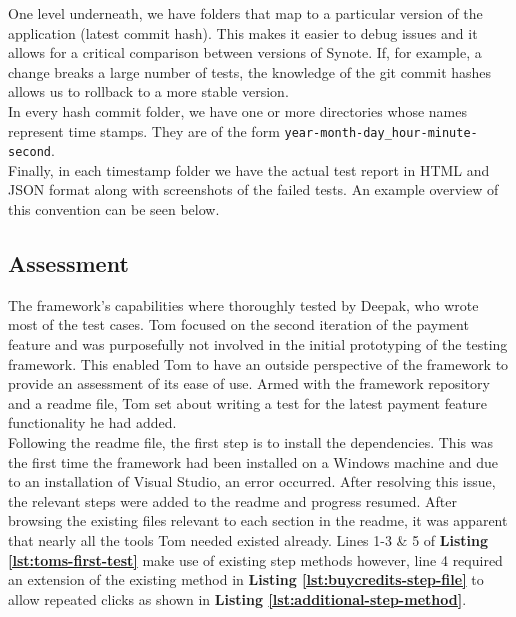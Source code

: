 One level underneath, we have folders that map to a particular version of the application (latest commit hash). This makes it easier to debug issues and it allows for a critical comparison between versions of Synote. If, for example, a change breaks a large number of tests, the knowledge of the git commit hashes allows us to rollback to a more stable version. 
\\

In every hash commit folder, we have one or more directories whose names represent time stamps. They are of the form 
\texttt{year-month-day\_hour-minute-second}.
\\

Finally, in each timestamp folder we have the actual test report in HTML and JSON format along with screenshots of the failed tests. An example overview of this convention can be seen below.
\\

\label{fig:reports-file-structure}

\subsection{Assessment}
\label{subsec:assessment}

The framework's capabilities where thoroughly tested by Deepak, who wrote most of the test cases. Tom focused on the second iteration of the payment feature and was purposefully not involved in the initial prototyping of the testing framework. This enabled Tom to have an outside perspective of the framework to provide an assessment of its ease of use. Armed with the framework repository and a readme file, Tom set about writing a test for the latest payment feature functionality he had added.\\

Following the readme file, the first step is to install the dependencies. This was the first time the framework had been installed on a Windows machine and due to an installation of Visual Studio, an error occurred. After resolving this issue, the relevant steps were added to the readme and progress resumed. After browsing the existing files relevant to each section in the readme, it was apparent that nearly all the tools Tom needed existed already. Lines 1-3 \& 5 of \textbf{Listing \ref{lst:toms-first-test}} make use of existing step methods however, line 4 required an extension of the existing method in \textbf{Listing \ref{lst:buycredits-step-file}} to allow repeated clicks as shown in \textbf{Listing \ref{lst:additional-step-method}}.\\

